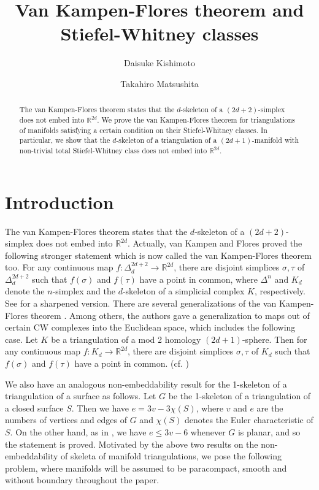 \documentclass[amsfonts]{amsart}
\title{Van Kampen-Flores theorem and Stiefel-Whitney classes}
\author{Daisuke Kishimoto}
\author{Takahiro Matsushita}
\numberwithin{equation}{section}
\theoremstyle{definition}
\theoremstyle{remark}
\newcommand{\R}{\mathbb{R}}
\begin{document}
  \maketitle




  \begin{abstract}
    The van Kampen-Flores theorem states that the $d$-skeleton of a $(2d+2)$-simplex does not embed into $\R^{2d}$. We prove the van Kampen-Flores theorem for triangulations of manifolds satisfying a certain condition on their Stiefel-Whitney classes. In particular, we show that the $d$-skeleton of a triangulation of a $(2d+1)$-manifold with non-trivial total Stiefel-Whitney class does not embed into $\R^{2d}$.
  \end{abstract}




  \section{Introduction}

  The van Kampen-Flores theorem states that the $d$-skeleton of a $(2d+2)$-simplex does not embed into $\R^{2d}$. Actually, van Kampen \cite{K} and Flores \cite{F} proved the following stronger statement which is now called the van Kampen-Flores theorem too. For any continuous map $f\colon \Delta^{2d+2}_d\to\R^{2d}$, there are disjoint simplices $\sigma,\tau$ of $\Delta^{2d+2}_d$ such that $f(\sigma)$ and $f(\tau)$ have a point in common, where $\Delta^n$ and $K_d$ denote the $n$-simplex and the $d$-skeleton of a simplicial complex $K$, respectively. See \cite{BFZ} for a sharpened version. There are several generalizations of the van Kampen-Flores theorem \cite{BFZ,BZ,GMPPTW,JPZ,JVZ,KM,MSP,NW,S,V}. Among others, the authors
\cite{KM} gave a generalization to maps out of certain CW complexes into the Euclidean space, which includes the following case. Let $K$ be a triangulation of a mod 2 homology $(2d+1)$-sphere. Then for any continuous map $f\colon K_d\to\R^{2d}$, there are disjoint simplices $\sigma,\tau$ of $K_d$ such that $f(\sigma)$ and $f(\tau)$ have a point in common. (cf. \cite{NW})



  We also have an analogous non-embeddability result for the 1-skeleton of a triangulation of a surface as follows. Let $G$ be the 1-skeleton of a triangulation of a closed surface $S$. Then we have $e=3v-3\chi(S)$, where $v$ and $e$ are the numbers of vertices and edges of $G$ and $\chi(S)$ denotes the Euler characteristic of $S$. On the other hand, as in \cite[Corollary 9.5.1]{BM}, we have $e\le 3v-6$ whenever $G$ is planar, and so the statement is proved. Motivated by the above two results on the non-embeddability of skeleta of manifold triangulations, we pose the following problem, where manifolds will be assumed to be paracompact, smooth and without boundary throughout the paper.
\end{document}
